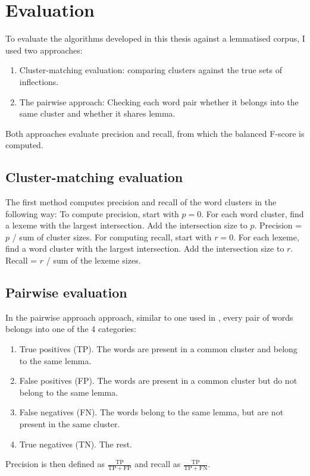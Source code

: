 \section{Evaluation}

To evaluate the algorithms developed in this thesis against a lemmatised corpus, I used two approaches:
\begin{enumerate}
\item Cluster-matching evaluation: comparing clusters against the true sets of inflections. 
\item The pairwise approach: Checking each word pair whether it belongs into the same cluster and whether it shares lemma.
\end{enumerate}

Both approaches evaluate precision and recall, from which the balanced F-score is computed.

\subsection{Cluster-matching evaluation}
The first method computes precision and recall of the word clusters in the following way: To compute precision, start with $p = 0$. For each word cluster, find a lexeme with the largest intersection. Add the intersection size to $p$. Precision = $p$ / sum of cluster sizes. For computing recall, start with $r = 0$. For each lexeme, find a word cluster with the largest intersection. Add the intersection size to $r$. Recall = $r$ / sum of the lexeme sizes.

\subsection{Pairwise evaluation}
In the pairwise approach approach, similar to one used in \cite{snover-jarosz-2002}, every pair of words belongs into one of the 4 categories:
\begin{enumerate}
\item True positives (TP). The words are present in a common cluster and belong to the same lemma.
\item False positives (FP). The words are present in a common cluster but do not belong to the same lemma.
\item False negatives (FN). The words belong to the same lemma, but are not present in the same cluster.
\item True negatives (TN). The rest.
\end{enumerate}
Precision is then defined as $\frac{\mathrm{TP}}{\mathrm{TP} + \mathrm{FP}}$ and recall as $\frac{\mathrm{TP}}{\mathrm{TP} + \mathrm{FN}}$.

